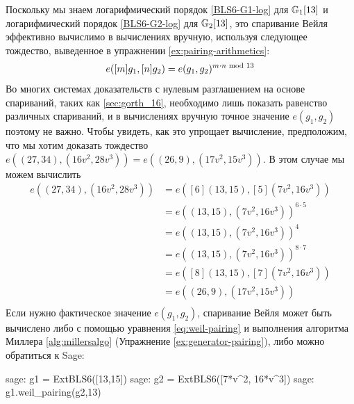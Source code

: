 Поскольку мы знаем логарифмический порядок \ref{BLS6-G1-log} для $\mathbb{G}_1[13]$ и логарифмический порядок \ref{BLS6-G2-log} для $\mathbb{G}_2[13]$, это спаривание Вейля эффективно вычислимо в вычислениях вручную, используя следующее тождество, выведенное в упражнении \ref{ex:pairing-arithmetics}:  
\begin{equation}\label{eq:bilinearityBLS6}
e([m]g_{1},[n]g_{2}) = 
e(g_{1},g_{2})^{m\cdot n \text{ mod } 13}
\end{equation}
Во многих системах доказательств с нулевым разглашением на основе спариваний, таких как \ref{sec:gorth_16}, необходимо лишь показать равенство различных спариваний, и в вычислениях вручную точное значение $e(g_{1},g_{2})$ поэтому не важно. Чтобы увидеть, как это упрощает вычисление, предположим, что мы хотим доказать тождество $e((27,34),(16v^2,28v^3))=e((26,9),(17v^2,15v^3))$. В этом случае мы можем вычислить
\begin{align*}
e((27,34),(16v^2,28v^3)) 
               & = e([6](13,15),[5](7v^2,16v^3))\\
               & = e((13,15),(7v^2,16v^3))^{6\cdot 5}\\
               & = e((13,15),(7v^2,16v^3))^{4}\\
               & = e((13,15),(7v^2,16v^3))^{8\cdot 7}\\
               & = e([8](13,15),[7](7v^2,16v^3))\\
               & = e((26,9),(17v^2,15v^3))\\
\end{align*}
Если нужно фактическое значение $e(g_{1},g_{2})$, спаривание Вейля может быть вычислено либо с помощью уравнения \ref{eq:weil-pairing} и выполнения алгоритма Миллера \ref{alg:millersalgo} (Упражнение \ref{ex:generator-pairing}), либо можно обратиться к Sage:  
\begin{sagecommandline}
sage: g1 = ExtBLS6([13,15])
sage: g2 = ExtBLS6([7*v^2, 16*v^3])
sage: g1.weil_pairing(g2,13)
\end{sagecommandline}

